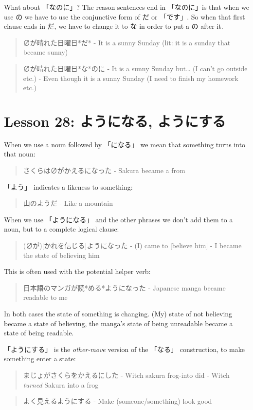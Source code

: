 \documentclass[11pt]{article}
\begin{document}
What about 「なのに」? The reason sentences end in 「なのに」is that when we use の we have to use the conjunctive form of だ or 「です」. So when that first clause ends in だ, we have to change it to な in order to put a の after it.
\begin{quote}
∅が晴れた日曜日*だ* - It is a sunny Sunday (lit: it is a sunday that became sunny)
\end{quote}
\begin{quote}
∅が晴れた日曜日*な*のに - It is a sunny Sunday but\ldots{} (I can't go outside etc.) - Even though it is a sunny Sunday (I need to finish my homework etc.)
\end{quote}
\section{Lesson 28: ようになる, ようにする}
\label{sec:org61eb43c}
When we use a noun followed by 「になる」 we mean that something turns into that noun:
\begin{quote}
さくらは∅がかえるになった - Sakura became a from
\end{quote}

「よう」 indicates a likeness to something:
\begin{quote}
山のようだ - Like a mountain
\end{quote}

When we use 「ようになる」 and the other phrases we don't add them to a noun, but to a complete logical clause:
\begin{quote}
(∅が)[かれを信じる]ようになった - (I) came to [believe him] - I became the state of believing him
\end{quote}

This is often used with the potential helper verb:
\begin{quote}
日本語のマンガが読*める*ようになった - Japanese manga became readable to me
\end{quote}

In both cases the state of something is changing. (My) state of not believing became a state of believing, the manga's state of being unreadable became a state of being readable.

「ようにする」 is the \emph{other-move} version of the 「なる」 construction, to make something enter a state:
\begin{quote}
まじょがさくらをかえるにした - Witch sakura frog-into did - Witch \emph{turned} Sakura into a frog
\end{quote}
\begin{quote}
よく見えるようにする - Make (someone/something) look good
\end{quote}
\end{document}
